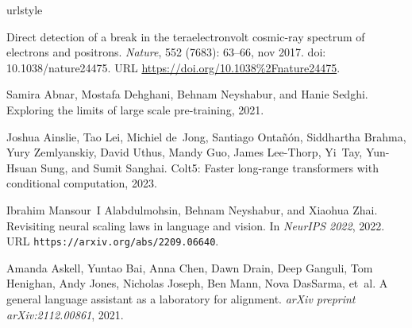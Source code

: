 \documentclass{article} %
\begin{document}
\fi




\clearpage


%



\begin{thebibliography}{67}
\providecommand{\natexlab}[1]{#1}
\providecommand{\url}[1]{\texttt{#1}}
\expandafter\ifx\csname urlstyle\endcsname\relax
  \providecommand{\doi}[1]{doi: #1}\else
  \providecommand{\doi}{doi: \begingroup \urlstyle{rm}\Url}\fi

Direct detection of a break in the teraelectronvolt cosmic-ray spectrum of
  electrons and positrons.
\newblock \emph{Nature}, 552 (7683): 63--66, nov 2017.
\newblock \doi{10.1038/nature24475}.
\newblock URL \url{https://doi.org/10.1038%2Fnature24475}.

Samira Abnar, Mostafa Dehghani, Behnam Neyshabur, and Hanie Sedghi.
\newblock Exploring the limits of large scale pre-training, 2021.

Joshua Ainslie, Tao Lei, Michiel de~Jong, Santiago Ontañón, Siddhartha
  Brahma, Yury Zemlyanskiy, David Uthus, Mandy Guo, James Lee-Thorp, Yi~Tay,
  Yun-Hsuan Sung, and Sumit Sanghai.
\newblock Colt5: Faster long-range transformers with conditional computation,
  2023.

Ibrahim Mansour~I Alabdulmohsin, Behnam Neyshabur, and Xiaohua Zhai.
\newblock Revisiting neural scaling laws in language and vision.
\newblock In \emph{NeurIPS 2022}, 2022.
\newblock URL \url{https://arxiv.org/abs/2209.06640}.

Amanda Askell, Yuntao Bai, Anna Chen, Dawn Drain, Deep Ganguli, Tom Henighan,
  Andy Jones, Nicholas Joseph, Ben Mann, Nova DasSarma, et~al.
\newblock A general language assistant as a laboratory for alignment.
\newblock \emph{arXiv preprint arXiv:2112.00861}, 2021.


\end{thebibliography}
\end{document}
